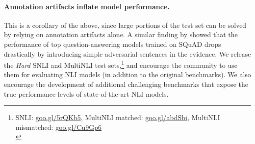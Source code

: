 \paragraph{Annotation artifacts inflate model performance.} This is a corollary of the above, since large portions of the test set can be solved by relying on annotation artifacts alone. A similar finding by \citet{Jia:2017} showed that the performance of top question-answering models trained on SQuAD \cite{Rajpurkar:2016} drops drastically by introducing simple adversarial sentences in the evidence. We release the \textit{Hard} SNLI and MultiNLI test sets,\footnote{SNLI: \url{goo.gl/5rQKb5}, MultiNLI matched: \url{goo.gl/abdSbi}, MultiNLI mismatched: \url{goo.gl/Cu9Gp6}\\}
and encourage the community to use them for evaluating NLI models (in addition to the original benchmarks). We also encourage the development of additional challenging benchmarks that expose the true performance levels of state-of-the-art NLI models.


